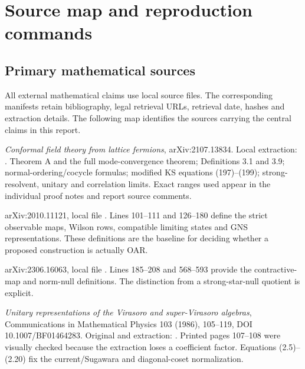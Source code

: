\section{Source map and reproduction commands}
\raggedright

\subsection{Primary mathematical sources}

All external mathematical claims use local source files. The corresponding
manifests retain bibliography, legal retrieval URLs, retrieval date, hashes
and extraction details. The following map identifies the sources carrying
the central claims in this report.

\begin{description}[style=nextline]
\item[OS: Osborne--Stottmeister.]
\emph{Conformal field theory from lattice fermions}, arXiv:2107.13834.
Local extraction: .
Theorem A and the full mode-convergence theorem; Definitions 3.1 and 3.9;
normal-ordering/cocycle formulas; modified KS equations (197)--(199);
strong-resolvent, unitary and correlation limits. Exact ranges used appear
in the individual proof notes and report source comments.

\item[Wavelet OAR framework.]
arXiv:2010.11121, local file
.
Lines 101--111 and 126--180 define the strict observable maps, Wilson rows,
compatible limiting states and GNS representations. These definitions are
the baseline for deciding whether a proposed construction is actually OAR.

\item[Soft inductive-limit framework.]
arXiv:2306.16063, local file
.
Lines 185--208 and 568--593 provide the contractive-map and norm-null
definitions. The distinction from a strong-star-null quotient is explicit.

\item[GKO: Goddard--Kent--Olive.]
\emph{Unitary representations of the Virasoro and super-Virasoro algebras},
Communications in Mathematical Physics 103 (1986), 105--119,
DOI 10.1007/BF01464283. Original and extraction:
.
Printed pages 107--108 were visually checked because the extraction loses
a coefficient factor. Equations (2.5)--(2.20) fix the current/Sugawara and
diagonal-coset normalization.


\end{description}
